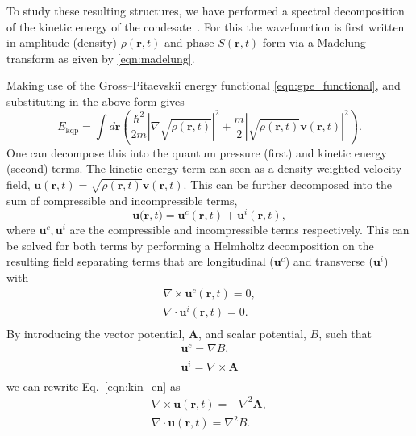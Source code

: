 \iffalse
To study these resulting structures, we have performed a spectral decomposition of the kinetic energy of the condesate~\cite{CT:Nore_prl_1997,CT:Nore_pof_1997,CT:Bradley_prx_2012}. For this the wavefunction is first written in amplitude (density) $\rho(\mathbf{r},t)$ and phase $S(\mathbf{r},t)$ form via a Madelung transform as given by \eqref{eqn:madelung}.
\iffalse
as
$
		\Psi(\mathbf{r},t) = \sqrt{\rho(\mathbf{r},t)}\exp{\left[\mathrm{i}S(\mathbf{r},t)\right]}.
$
\fi
Making use of the Gross--Pitaevskii energy functional \eqref{eqn:gpe_functional}, and substituting in the above form gives
\begin{equation}
    E_{\text{kqp}} = \int d\mathbf{r} \left( \frac{\hbar^2}{2m}| \nabla\sqrt{\rho(\mathbf{r},t)} |^2  + \frac{m}{2}|\sqrt{\rho(\mathbf{r},t)}\mathbf{v}(\mathbf{r},t) |^2\right).
\end{equation}
One can decompose this into the quantum pressure (first) and kinetic energy (second) terms. The kinetic energy term can seen as a density-weighted velocity field, $\mathbf{u}(\mathbf{r},t) = \sqrt{\rho(\mathbf{r},t)}\mathbf{v}(\mathbf{r},t)$. This can be further decomposed into the sum of compressible and incompressible terms,
\begin{equation}\label{eqn:kin_en}
    \mathbf{u(r},t) = \mathbf{u}^c(\mathbf{r},t) + \mathbf{u}^i(\mathbf{r},t),
\end{equation}
where $\mathbf{u}^c, \mathbf{u}^i$ are the compressible and incompressible terms respectively. This can be solved for both terms by performing a Helmholtz decomposition on the resulting field separating terms that are longitudinal ($\mathbf{u}^c$) and transverse ($\mathbf{u}^i$) with
\begin{subequations}\label{eqn:kinterms}
\begin{align}
    \nabla \times \mathbf{u}^c(\mathbf{r},t) = 0, \\
    \nabla \cdot \mathbf{u}^i(\mathbf{r},t) = 0.\\
\end{align}
\end{subequations}
By introducing the vector potential, $\mathbf{A}$, and scalar potential, $B$, such that
\begin{subequations}
\begin{align}
    \mathbf{u}^c = \nabla B, \\
    \mathbf{u}^i = \nabla \times \mathbf{A} \\
\end{align}
\end{subequations}
we can rewrite Eq.~\eqref{eqn:kin_en} as
\begin{align}
    \nabla \times \mathbf{u}(\mathbf{r},t) = -\nabla^2 \mathbf{A}, \\
    \nabla \cdot \mathbf{u}(\mathbf{r},t) = \nabla^2 {B}. \\
\end{align}

